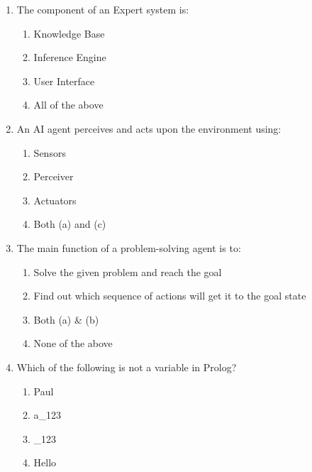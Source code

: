 \documentclass[11pt,a4paper]{article}
\begin{document}
\begin{enumerate}[label=(\roman*),leftmargin=*,itemsep=12pt]
\begin{enumerate}[label=(\alph*),itemsep=2pt]
    \item Boolean Algebra
    \item Turing Test
    \item Logarithm
    \item Algorithm
  \end{enumerate}
  
  \item The component of an Expert system is:
  
\begin{enumerate}[label=(\alph*),itemsep=2pt]
    \item Knowledge Base
    \item Inference Engine
    \item User Interface
    \item All of the above
  \end{enumerate}
  
  \item An AI agent perceives and acts upon the environment using:
  
\begin{enumerate}[label=(\alph*),itemsep=2pt]
    \item Sensors
    \item Perceiver
    \item Actuators
    \item Both (a) and (c)
  \end{enumerate}
  
  \item The main function of a problem-solving agent is to:
  
\begin{enumerate}[label=(\alph*),itemsep=2pt]
    \item Solve the given problem and reach the goal
    \item Find out which sequence of actions will get it to the goal state
    \item Both (a) \& (b)
    \item None of the above
  \end{enumerate}
  
  \item Which of the following is not a variable in Prolog?
  
\begin{enumerate}[label=(\alph*),itemsep=2pt]
    \item Paul
    \item a\_123
    \item \_123
    \item Hello
  \end{enumerate}
  

\end{enumerate}
\end{document}
